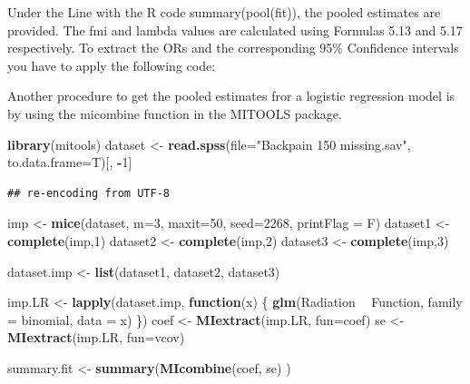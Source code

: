 \documentclass[]{book}
\newenvironment{Shaded}{\begin{snugshade}}{\end{snugshade}}
\newcommand{\KeywordTok}[1]{\textcolor[rgb]{0.13,0.29,0.53}{\textbf{#1}}}
\newcommand{\DataTypeTok}[1]{\textcolor[rgb]{0.13,0.29,0.53}{#1}}
\newcommand{\DecValTok}[1]{\textcolor[rgb]{0.00,0.00,0.81}{#1}}
\newcommand{\StringTok}[1]{\textcolor[rgb]{0.31,0.60,0.02}{#1}}
\newcommand{\ControlFlowTok}[1]{\textcolor[rgb]{0.13,0.29,0.53}{\textbf{#1}}}
\newcommand{\OperatorTok}[1]{\textcolor[rgb]{0.81,0.36,0.00}{\textbf{#1}}}
\newcommand{\NormalTok}[1]{#1}
\theoremstyle{definition}
\theoremstyle{definition}
\theoremstyle{definition}
\theoremstyle{remark}
\begin{document}
Under the Line with the R code summary(pool(fit)), the pooled estimates
are provided. The fmi and lambda values are calculated using Formulas
5.13 and 5.17 respectively. To extract the ORs and the corresponding
95\% Confidence intervals you have to apply the following code:

Another procedure to get the pooled estimates fror a logistic regression
model is by using the micombine function in the MITOOLS package.

\begin{Shaded}
\begin{Highlighting}[]
\KeywordTok{library}\NormalTok{(mitools)}
\NormalTok{dataset <-}\StringTok{ }\KeywordTok{read.spss}\NormalTok{(}\DataTypeTok{file=}\StringTok{"Backpain 150 missing.sav"}\NormalTok{, }\DataTypeTok{to.data.frame=}\NormalTok{T)[, }\OperatorTok{-}\DecValTok{1}\NormalTok{]}
\end{Highlighting}
\end{Shaded}

\begin{verbatim}
## re-encoding from UTF-8
\end{verbatim}

\begin{Shaded}
\begin{Highlighting}[]
\NormalTok{imp <-}\StringTok{ }\KeywordTok{mice}\NormalTok{(dataset, }\DataTypeTok{m=}\DecValTok{3}\NormalTok{, }\DataTypeTok{maxit=}\DecValTok{50}\NormalTok{, }\DataTypeTok{seed=}\DecValTok{2268}\NormalTok{, }\DataTypeTok{printFlag =}\NormalTok{ F)}
\NormalTok{dataset1 <-}\StringTok{ }\KeywordTok{complete}\NormalTok{(imp,}\DecValTok{1}\NormalTok{)}
\NormalTok{dataset2 <-}\StringTok{ }\KeywordTok{complete}\NormalTok{(imp,}\DecValTok{2}\NormalTok{)}
\NormalTok{dataset3 <-}\StringTok{ }\KeywordTok{complete}\NormalTok{(imp,}\DecValTok{3}\NormalTok{)}
 
\NormalTok{dataset.imp <-}\StringTok{ }\KeywordTok{list}\NormalTok{(dataset1, dataset2, dataset3)}
 
\NormalTok{imp.LR <-}\StringTok{ }\KeywordTok{lapply}\NormalTok{(dataset.imp, }\ControlFlowTok{function}\NormalTok{(x) \{}
   \KeywordTok{glm}\NormalTok{(Radiation }\OperatorTok{~}\StringTok{ }\NormalTok{Function, }\DataTypeTok{family =}\NormalTok{ binomial, }\DataTypeTok{data =}\NormalTok{ x)}
\NormalTok{  \})}
\NormalTok{coef <-}\StringTok{ }\KeywordTok{MIextract}\NormalTok{(imp.LR, }\DataTypeTok{fun=}\NormalTok{coef) }
\NormalTok{se <-}\StringTok{ }\KeywordTok{MIextract}\NormalTok{(imp.LR, }\DataTypeTok{fun=}\NormalTok{vcov) }
 
\NormalTok{summary.fit <-}\StringTok{ }\KeywordTok{summary}\NormalTok{(}\KeywordTok{MIcombine}\NormalTok{(coef, se) )}
\end{Highlighting}
\end{Shaded}
\end{document}
